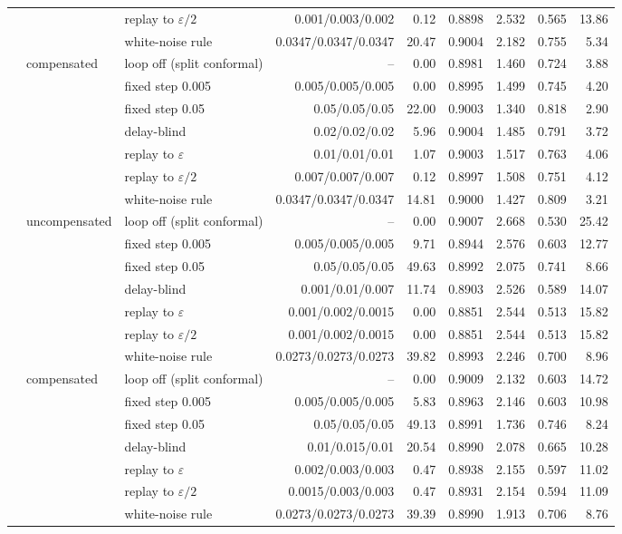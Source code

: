 \begin{tabular}{@{}rllrrrrrr@{}}
 &  & replay to $\varepsilon/2$ & 0.001/0.003/0.002 & 0.12 & 0.8898 & 2.532 & 0.565 & 13.86 \\
 &  & white-noise rule & 0.0347/0.0347/0.0347 & 20.47 & 0.9004 & 2.182 & 0.755 & 5.34 \\
 & compensated & loop off (split conformal) & -- & 0.00 & 0.8981 & 1.460 & 0.724 & 3.88 \\
 &  & fixed step 0.005 & 0.005/0.005/0.005 & 0.00 & 0.8995 & 1.499 & 0.745 & 4.20 \\
 &  & fixed step 0.05 & 0.05/0.05/0.05 & 22.00 & 0.9003 & 1.340 & 0.818 & 2.90 \\
 &  & delay-blind & 0.02/0.02/0.02 & 5.96 & 0.9004 & 1.485 & 0.791 & 3.72 \\
 &  & replay to $\varepsilon$ & 0.01/0.01/0.01 & 1.07 & 0.9003 & 1.517 & 0.763 & 4.06 \\
 &  & replay to $\varepsilon/2$ & 0.007/0.007/0.007 & 0.12 & 0.8997 & 1.508 & 0.751 & 4.12 \\
 &  & white-noise rule & 0.0347/0.0347/0.0347 & 14.81 & 0.9000 & 1.427 & 0.809 & 3.21 \\
\addlinespace
14 & uncompensated & loop off (split conformal) & -- & 0.00 & 0.9007 & 2.668 & 0.530 & 25.42 \\
 &  & fixed step 0.005 & 0.005/0.005/0.005 & 9.71 & 0.8944 & 2.576 & 0.603 & 12.77 \\
 &  & fixed step 0.05 & 0.05/0.05/0.05 & 49.63 & 0.8992 & 2.075 & 0.741 & 8.66 \\
 &  & delay-blind & 0.001/0.01/0.007 & 11.74 & 0.8903 & 2.526 & 0.589 & 14.07 \\
 &  & replay to $\varepsilon$ & 0.001/0.002/0.0015 & 0.00 & 0.8851 & 2.544 & 0.513 & 15.82 \\
 &  & replay to $\varepsilon/2$ & 0.001/0.002/0.0015 & 0.00 & 0.8851 & 2.544 & 0.513 & 15.82 \\
 &  & white-noise rule & 0.0273/0.0273/0.0273 & 39.82 & 0.8993 & 2.246 & 0.700 & 8.96 \\
 & compensated & loop off (split conformal) & -- & 0.00 & 0.9009 & 2.132 & 0.603 & 14.72 \\
 &  & fixed step 0.005 & 0.005/0.005/0.005 & 5.83 & 0.8963 & 2.146 & 0.603 & 10.98 \\
 &  & fixed step 0.05 & 0.05/0.05/0.05 & 49.13 & 0.8991 & 1.736 & 0.746 & 8.24 \\
 &  & delay-blind & 0.01/0.015/0.01 & 20.54 & 0.8990 & 2.078 & 0.665 & 10.28 \\
 &  & replay to $\varepsilon$ & 0.002/0.003/0.003 & 0.47 & 0.8938 & 2.155 & 0.597 & 11.02 \\
 &  & replay to $\varepsilon/2$ & 0.0015/0.003/0.003 & 0.47 & 0.8931 & 2.154 & 0.594 & 11.09 \\
 &  & white-noise rule & 0.0273/0.0273/0.0273 & 39.39 & 0.8990 & 1.913 & 0.706 & 8.76 \\
\bottomrule
\end{tabular}
